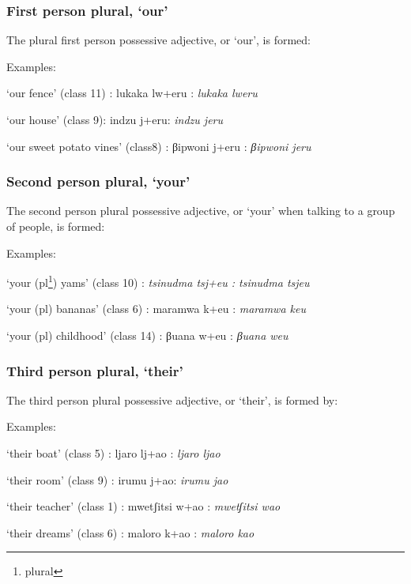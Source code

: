 \subsubsection{First person plural, `our'}
The plural first person possessive adjective, or `our', is formed:


Examples:\begin{wrdex}
\item `our fence' (class 11) : lukaka lw+eru : \emph{lukaka lweru}
\item `our house' (class 9): indzu j+eru: \emph{indzu jeru}
\item `our sweet potato vines' (class8) : βipwoni \beta{}j+eru : \emph{βipwoni \beta{}jeru}
\end{wrdex}

\subsubsection{Second person plural, `your'}
The second person plural possessive adjective, or `your' when talking to a group of people, is formed:


Examples:
\begin{wrdex}
\item `your (pl\footnote{plural}) yams' (class 10) : \emph{tsinudma tsj+e\palnas{}u : tsinudma tsje\palnas{}u}
\item `your (pl) bananas' (class 6) : maramwa k+e\palnas{}u : \emph{maramwa ke\palnas{}u}
\item `your (pl) childhood' (class 14) : βuana \beta{}w+e\palnas{}u : \emph{βuana \beta{}we\palnas{}u}
\end{wrdex}

\subsubsection{Third person plural, `their'}
The third person plural possessive adjective, or `their', is formed by:


Examples:\begin{wrdex}
\item `their boat' (class 5) : ljaro lj+a\beta{}o : \emph{ljaro lja\beta{}o}
\item `their room' (class 9) : irumu j+a\beta{}o: \emph{irumu ja\beta{}o}
\item `their teacher' (class 1) : mwetʃitsi w+a\beta{}o : \emph{mwetʃitsi wa\beta{}o}
\item `their dreams' (class 6) : maloro k+a\beta{}o : \emph{maloro ka\beta{}o}
\end{wrdex}

